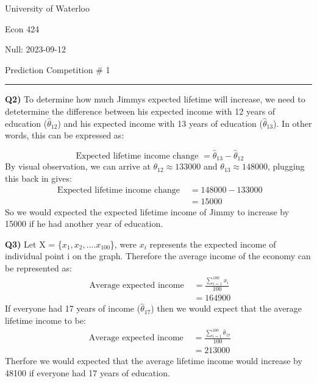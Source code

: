 \documentclass{article}
\begin{document}
\begin{titlepage}
	\setlength{\parindent}{0pt}
	\large

\vspace*{-2cm}

University of Waterloo \par
Econ 424 \par
\vspace{0.05cm}
Null: 2023-09-12
\vspace{0.2cm}

{\huge Prediction Competition \# 1 \par}
\hrule

\vspace{1cm}
\textbf{Q2)} To determine how much Jimmys expected lifetime will increase, we need to detetermine the difference between his expected income with 12 years of education ($\hat \theta_{12}$) and his expected income with 13 years of education ($\hat \theta_{13}$). In other words, this can be expressed as: \par
\[ \text{ Expected lifetime income change } = \hat \theta_{13} - \hat \theta_{12} \]
By visual observation, we can arrive at $\theta_{12} \approx 133000$ and $\theta_{13} \approx 148000$, plugging this back in gives:
\begin{align*} 
\text{ Expected lifetime income change } &= 148000 - 133000 \\
&=  15000
\end{align*}
So we would expected the expected lifetime income of Jimmy to increase by 15000 if he had another year of education. \par

\vspace{0.7cm}

\textbf{Q3)} Let X = \{$x_1, x_2, .... x_{100}$\}, were $x_i$ represents the expected income of individual point i on the graph. Therefore the average income of the economy can be represented as:
\begin{align*} 
\text{ Average expected income } &= \frac{\sum^{100}_{i=1}x_i}{100} \\
&=  164900
\end{align*}
If everyone had 17 years of income ($\hat \theta_{17}$) then we would expect that the average lifetime income to be:
\begin{align*} 
\text{ Average expected income } &= \frac{\sum^{100}_{i=1}\hat \theta_{17} }{100} \\
&=  213000
\end{align*}
Therfore we would expected that the average lifetime income would increase by 48100 if everyone had 17 years of education. \par


\end{titlepage}
\end{document}
